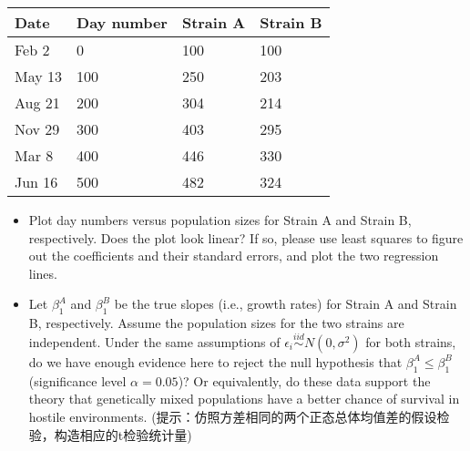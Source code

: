 \documentclass[]{article}
\begin{document}
\begin{longtable}[]{@{}llll@{}}
\toprule
Date & Day number & Strain A & Strain B\tabularnewline
\midrule
\endhead
Feb 2 & 0 & 100 & 100\tabularnewline
May 13 & 100 & 250 & 203\tabularnewline
Aug 21 & 200 & 304 & 214\tabularnewline
Nov 29 & 300 & 403 & 295\tabularnewline
Mar 8 & 400 & 446 & 330\tabularnewline
Jun 16 & 500 & 482 & 324\tabularnewline
\bottomrule
\end{longtable}

\begin{itemize}
\item
  Plot day numbers versus population sizes for Strain A and Strain B,
  respectively. Does the plot look linear? If so, please use least
  squares to figure out the coefficients and their standard errors, and
  plot the two regression lines.
\item
  Let \(\beta_1^A\) and \(\beta_1^B\) be the true slopes (i.e., growth
  rates) for Strain A and Strain B, respectively. Assume the population
  sizes for the two strains are independent. Under the same assumptions
  of \(\epsilon_i\stackrel{iid}{\sim} N(0,\sigma^2)\) for both strains,
  do we have enough evidence here to reject the null hypothesis that
  \(\beta_1^A\le \beta_1^B\) (significance level \(\alpha=0.05\))? Or
  equivalently, do these data support the theory that genetically mixed
  populations have a better chance of survival in hostile environments.
  (提示：仿照方差相同的两个正态总体均值差的假设检验，构造相应的t检验统计量)
\end{itemize}
\end{document}
